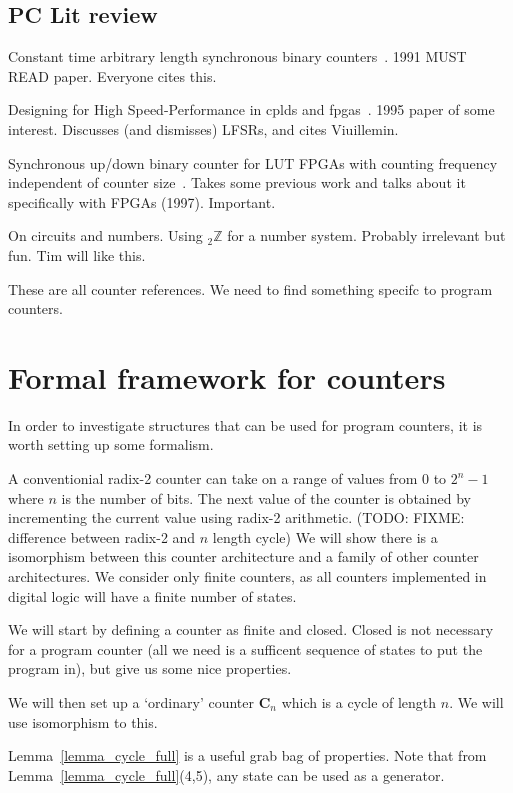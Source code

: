 \documentclass[5p, twocolumn]{elsarticle}
\begin{document}
\subsection{PC Lit review}

Constant time arbitrary length synchronous binary counters~\cite{vuillemin1991constant}. 1991 MUST READ paper. Everyone cites this.

Designing for High Speed-Performance in cplds and fpgas~\cite{zilic1995designing}. 1995 paper of some interest. Discusses (and dismisses) LFSRs, and cites Viuillemin.

Synchronous up/down binary counter for LUT FPGAs with counting frequency independent of counter size~\cite{tenca1997synchronous}. Takes some previous work and talks about it specifically with FPGAs (1997). Important.

On circuits and numbers\cite{vuillemin1994circuits}. Using $_2\mathbb{Z}$ for a number system. Probably irrelevant but fun. Tim will like this.

These are all counter references. We need to find something specifc to program counters.


\section{Formal framework for counters}

In order to investigate structures that can be used for program counters, it is worth setting up some formalism.

A conventionial radix-2 counter can take on a range of values from 0 to $2^n-1$ where $n$ is the number of bits. The next value of the counter is obtained by incrementing the current value using radix-2 arithmetic.  (TODO: FIXME: difference between radix-2 and $n$ length cycle) We will show there is a isomorphism between this counter architecture and a family of other counter architectures. We consider only finite counters, as all counters implemented in digital logic will have a finite number of states.

We will start by defining a counter as finite and closed. Closed is not necessary for a program counter (all we need is a sufficent sequence of states to put the program in), but give us some nice properties.

We will then set up a `ordinary' counter $\mathbf{C}_n$ which is a cycle of length $n$. We will use isomorphism to this.

Lemma~\ref{lemma_cycle_full} is a useful grab bag of properties. Note that from Lemma~\ref{lemma_cycle_full}(4,5), any state can be used as a generator.
\end{document}
